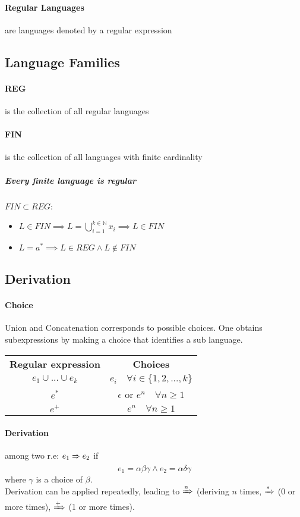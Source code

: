 \documentclass{article}
\newcommand{\N}{\mathds{N}}
\newcommand{\derives}[1][ ]{\xRightarrow{#1}}
\begin{document}
\paragraph{Regular Languages} are languages denoted by a regular expression
\subsection{Language Families}
\paragraph{REG} is the collection of all regular languages
\paragraph{FIN} is the collection of all languages with finite cardinality
\subparagraph{Every finite language is regular} $FIN \subset REG$: 
\begin{itemize}
\item $L\in FIN \implies L = \bigcup_{i=1}^{k \in \N} x_i \implies L \in FIN$
\item $L=a^* \implies L \in REG \wedge L \notin FIN$
\end{itemize}



\subsection{Derivation}
\paragraph{Choice} Union and Concatenation corresponds to possible choices. One obtains subexpressions by making a choice that identifies a sub language.
\begin{table}[h!]
\begin{center}
\begin{tabular}{cc}
\textbf{Regular expression}	&	\textbf{Choices}\\
$e_1\cup ... \cup e_k$	&	$e_i \quad \forall i \in \{1,2,...,k\}$\\
$e^*$	&	$\epsilon$ or $e^n \quad \forall n\geq 1$\\
$e^+$	&	$e^n \quad \forall n\geq 1$\\ 
\end{tabular}
\end{center}
\end{table}
\paragraph{Derivation} among two r.e: $e_1 \derives e_2$ if 
\[e_1=\alpha \beta \gamma \wedge e_2=\alpha \delta \gamma\]
where $\gamma$ is a choice of $\beta$.\\
Derivation can be applied repeatedly, leading to $\derives[n]$ (deriving $n$ times, $\derives[*]$ (0 or more times), $\derives[+]$ (1 or more times). 
\end{document}
